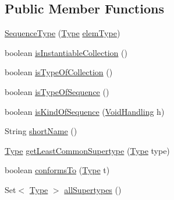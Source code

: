 \subsection*{Public Member Functions}
\begin{DoxyCompactItemize}
\item 
\hyperlink{classorg_1_1tzi_1_1use_1_1uml_1_1ocl_1_1type_1_1_sequence_type_a641c5069b7adf06db0938b82835ebfee}{Sequence\-Type} (\hyperlink{interfaceorg_1_1tzi_1_1use_1_1uml_1_1ocl_1_1type_1_1_type}{Type} \hyperlink{classorg_1_1tzi_1_1use_1_1uml_1_1ocl_1_1type_1_1_collection_type_a51cda1902aa2b4a9be4a40fa9b5b7aab}{elem\-Type})
\item 
boolean \hyperlink{classorg_1_1tzi_1_1use_1_1uml_1_1ocl_1_1type_1_1_sequence_type_a0abf45ff91d9a4c851a49e49bf10333a}{is\-Instantiable\-Collection} ()
\item 
boolean \hyperlink{classorg_1_1tzi_1_1use_1_1uml_1_1ocl_1_1type_1_1_sequence_type_af617c70cfffdaa80402f4fc8bf69548e}{is\-Type\-Of\-Collection} ()
\item 
boolean \hyperlink{classorg_1_1tzi_1_1use_1_1uml_1_1ocl_1_1type_1_1_sequence_type_a2fbd7be596aefa22809691ee564bab60}{is\-Type\-Of\-Sequence} ()
\item 
boolean \hyperlink{classorg_1_1tzi_1_1use_1_1uml_1_1ocl_1_1type_1_1_sequence_type_a7d8c2c8d6be5a8a8e1a378220788c6c6}{is\-Kind\-Of\-Sequence} (\hyperlink{enumorg_1_1tzi_1_1use_1_1uml_1_1ocl_1_1type_1_1_type_1_1_void_handling}{Void\-Handling} h)
\item 
String \hyperlink{classorg_1_1tzi_1_1use_1_1uml_1_1ocl_1_1type_1_1_sequence_type_a9c9a0eb5c5203da3c558f72a2ff5451f}{short\-Name} ()
\item 
\hyperlink{interfaceorg_1_1tzi_1_1use_1_1uml_1_1ocl_1_1type_1_1_type}{Type} \hyperlink{classorg_1_1tzi_1_1use_1_1uml_1_1ocl_1_1type_1_1_sequence_type_a590ea30bb9b61f55d64200772a0f314c}{get\-Least\-Common\-Supertype} (\hyperlink{interfaceorg_1_1tzi_1_1use_1_1uml_1_1ocl_1_1type_1_1_type}{Type} type)
\item 
boolean \hyperlink{classorg_1_1tzi_1_1use_1_1uml_1_1ocl_1_1type_1_1_sequence_type_a1eddc81ed19bbd66fef28c3c2535ba46}{conforms\-To} (\hyperlink{interfaceorg_1_1tzi_1_1use_1_1uml_1_1ocl_1_1type_1_1_type}{Type} t)
\item 
Set$<$ \hyperlink{interfaceorg_1_1tzi_1_1use_1_1uml_1_1ocl_1_1type_1_1_type}{Type} $>$ \hyperlink{classorg_1_1tzi_1_1use_1_1uml_1_1ocl_1_1type_1_1_sequence_type_a1898ee6208e0d3ac70d31ef26ddda6a1}{all\-Supertypes} ()
\item 

\end{DoxyCompactItemize}
